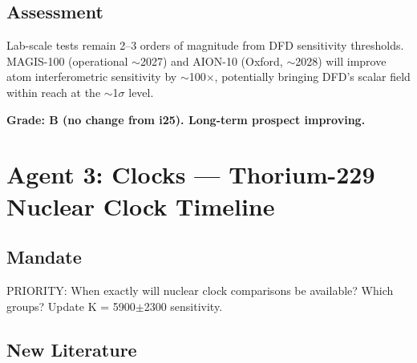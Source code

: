 \documentclass[11pt,a4paper]{article}
\begin{document}
\subsection{Assessment}
Lab-scale tests remain 2--3 orders of magnitude from DFD sensitivity thresholds. MAGIS-100 (operational $\sim$2027) and AION-10 (Oxford, $\sim$2028) will improve atom interferometric sensitivity by $\sim$100$\times$, potentially bringing DFD's scalar field within reach at the $\sim$1$\sigma$ level.

\textbf{Grade: B (no change from i25). Long-term prospect improving.}

\section{Agent 3: Clocks --- Thorium-229 Nuclear Clock Timeline}

\subsection{Mandate}
PRIORITY: When exactly will nuclear clock comparisons be available? Which groups? Update K = 5900$\pm$2300 sensitivity.

\subsection{New Literature}
\end{document}
